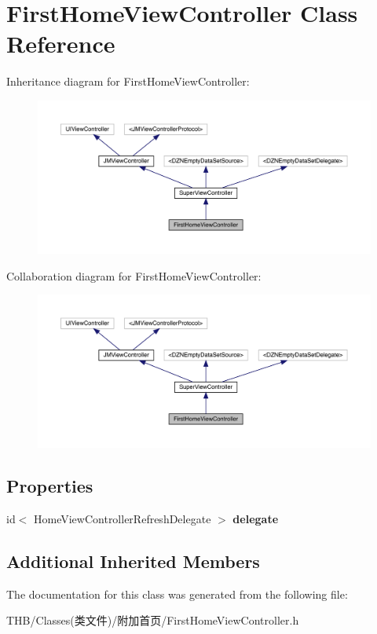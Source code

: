 \hypertarget{interface_first_home_view_controller}{}\section{First\+Home\+View\+Controller Class Reference}
\label{interface_first_home_view_controller}


Inheritance diagram for First\+Home\+View\+Controller\+:\nopagebreak
\begin{figure}[H]
\begin{center}
\leavevmode
\includegraphics[width=350pt]{interface_first_home_view_controller__inherit__graph}
\end{center}
\end{figure}


Collaboration diagram for First\+Home\+View\+Controller\+:\nopagebreak
\begin{figure}[H]
\begin{center}
\leavevmode
\includegraphics[width=350pt]{interface_first_home_view_controller__coll__graph}
\end{center}
\end{figure}
\subsection*{Properties}
\begin{DoxyCompactItemize}
\item 
\mbox{\label{interface_first_home_view_controller_ab873826cb5d4e72faa7e19a440d4e078}} 
id$<$ Home\+View\+Controller\+Refresh\+Delegate $>$ {\bfseries delegate}
\end{DoxyCompactItemize}
\subsection*{Additional Inherited Members}


The documentation for this class was generated from the following file\+:\begin{DoxyCompactItemize}
\item 
T\+H\+B/\+Classes(类文件)/附加首页/First\+Home\+View\+Controller.\+h\end{DoxyCompactItemize}
